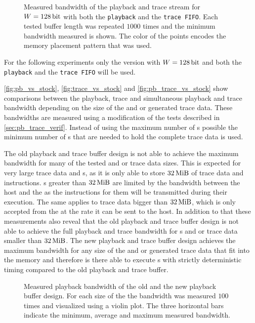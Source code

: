 \begin{figure}[H]
\caption{Measured bandwidth of the playback and trace stream for $W = \SI{128}{\bit}$ with both the \texttt{playback} and the \texttt{trace FIFO}. Each tested buffer length was repeated $\num{1000}$ times and the minimum bandwidth measured is shown. The color of the points encodes the memory placement pattern that was used.}\label{fig:pb_trace_128_both_fifo}
\end{figure}

For the following experiments only the version with $W = \SI{128}{\bit}$ and both the \texttt{playback} and the \texttt{trace FIFO} will be used.

\autoref{fig:pb_vs_stock}, \autoref{fig:trace_vs_stock} and \autoref{fig:pb_trace_vs_stock} show comparisons between the playback, trace and simultaneous playback and trace bandwidth depending on the size of the \PlaybackProgram{} and or generated trace data. These bandwidths are measured using a modification of the tests described in \autoref{sec:pb_trace_verif}. Instead of using the maximum number of \descriptor{}s possible the minimum number of \descriptor{}s that are needed to hold the complete \PlaybackProgram{} trace data is used.

The old playback and trace buffer design is not able to achieve the maximum bandwidth for many of the tested \PlaybackProgram{} and or trace data sizes. This is expected for very large trace data and \PlaybackProgram{}s, as it is only able to store $\SI{32}{\mebi\byte}$ of trace data and \PlaybackProgram{} instructions. \PlaybackProgram{}s greater than $\SI{32}{\mebi\byte}$ are limited by the bandwidth between the host and the \FPGA{} as the instructions for them will be transmitted during their execution. The same applies to trace data bigger than $\SI{32}{\mebi\byte}$, which is only accepted from the \pbexec{} at the rate it can be sent to the host.
In addition to that these measurements also reveal that the old playback and trace buffer design is not able to achieve the full playback and trace bandwidth for \PlaybackProgram{}s and or trace data smaller than $\SI{32}{\mebi\byte}$.
The new playback and trace buffer design achieves the maximum bandwidth for any size of the \PlaybackProgram{} and or generated trace data that fit into the memory and therefore is there able to execute \PlaybackProgram{}s with strictly deterministic timing compared to the old playback and trace buffer.
\begin{figure}[H]
\caption{Measured playback bandwidth of the old and the new playback buffer design. For each size of the \PlaybackProgram{} the bandwidth was measured $\num{100}$ times and visualized using a violin plot. The three horizontal bars indicate the minimum, average and maximum measured bandwidth.}\label{fig:pb_vs_stock}
\end{figure}

